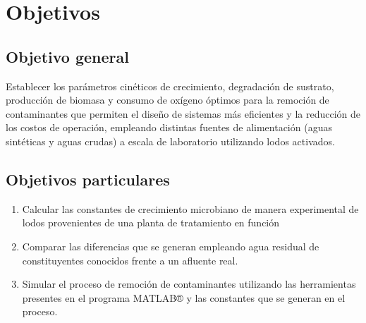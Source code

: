 \section{Objetivos}
\subsection{Objetivo general}
Establecer los parámetros cinéticos de crecimiento, degradación de sustrato, producción de biomasa y consumo de oxígeno óptimos para la remoción de contaminantes que permiten el diseño de sistemas más eficientes y la reducción de los costos de operación, empleando distintas fuentes de alimentación (aguas sintéticas y aguas crudas) a escala de laboratorio utilizando lodos activados.
\subsection{Objetivos particulares}
	\begin{enumerate}
		\item Calcular las constantes de crecimiento microbiano de manera experimental de lodos provenientes de una planta de tratamiento en función
		\item Comparar las diferencias que se generan empleando agua residual de constituyentes conocidos frente a un afluente real.
		\item Simular el proceso de remoción de contaminantes utilizando las herramientas presentes en el programa MATLAB® y las constantes que se generan en el proceso.
	\end{enumerate}
